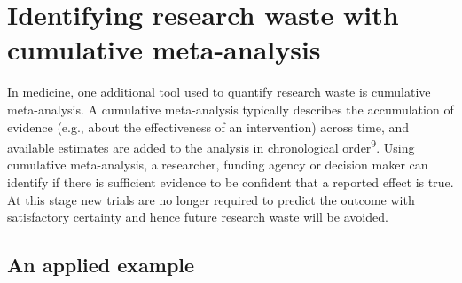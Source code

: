 \documentclass[]{article}
\begin{document}
\hypertarget{identifying-research-waste-with-cumulative-meta-analysis}{%
\section{Identifying research waste with cumulative
meta-analysis}\label{identifying-research-waste-with-cumulative-meta-analysis}}

In medicine, one additional tool used to quantify research waste is
cumulative meta-analysis. A cumulative meta-analysis typically describes
the accumulation of evidence (e.g., about the effectiveness of an
intervention) across time, and available estimates are added to the
analysis in chronological order\textsuperscript{9}. Using cumulative
meta-analysis, a researcher, funding agency or decision maker can
identify if there is sufficient evidence to be confident that a reported
effect is true. At this stage new trials are no longer required to
predict the outcome with satisfactory certainty and hence future
research waste will be avoided.

\hypertarget{an-applied-example}{%
\subsection{An applied example}\label{an-applied-example}}
\end{document}
